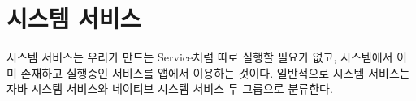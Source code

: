 \chapter{시스템 서비스}
시스템 서비스는 우리가 만드는 Service처럼 따로 실행할 필요가 없고, 시스템에서 이미 존재하고 실행중인 서비스를 앱에서 이용하는 것이다.
일반적으로 시스템 서비스는 자바 시스템 서비스와 네이티브 시스템 서비스 두 그룹으로 분류한다.\\

